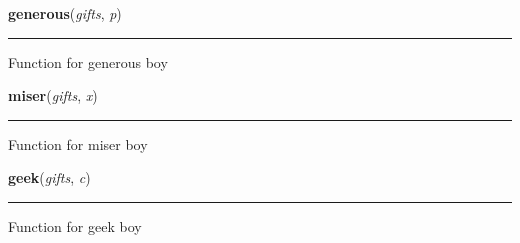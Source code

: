     \label{main:generous}

    \vspace{0.5ex}

\hspace{.8\funcindent}\begin{boxedminipage}{\funcwidth}

    \raggedright \textbf{generous}(\textit{gifts}, \textit{p})

    \vspace{-1.5ex}

    \rule{\textwidth}{0.5\fboxrule}
\setlength{\parskip}{2ex}
    Function for generous boy

\setlength{\parskip}{1ex}
    \end{boxedminipage}

    \label{main:miser}

    \vspace{0.5ex}

\hspace{.8\funcindent}\begin{boxedminipage}{\funcwidth}

    \raggedright \textbf{miser}(\textit{gifts}, \textit{x})

    \vspace{-1.5ex}

    \rule{\textwidth}{0.5\fboxrule}
\setlength{\parskip}{2ex}
    Function for miser boy

\setlength{\parskip}{1ex}
    \end{boxedminipage}

    \label{main:geek}

    \vspace{0.5ex}

\hspace{.8\funcindent}\begin{boxedminipage}{\funcwidth}

    \raggedright \textbf{geek}(\textit{gifts}, \textit{c})

    \vspace{-1.5ex}

    \rule{\textwidth}{0.5\fboxrule}
\setlength{\parskip}{2ex}
    Function for geek boy

\setlength{\parskip}{1ex}
    \end{boxedminipage}

